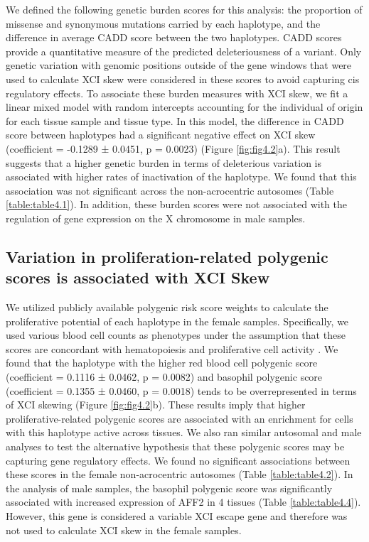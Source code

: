 We defined the following genetic burden scores for this analysis: the proportion of missense and synonymous mutations carried by each haplotype, and the difference in average CADD score \cite{Rentzsch2019-pk} between the two haplotypes. CADD scores provide a quantitative measure of the predicted deleteriousness of a variant. Only genetic variation with genomic positions outside of the gene windows that were used to calculate XCI skew were considered in these scores to avoid capturing cis regulatory effects. To associate these burden measures with XCI skew, we fit a linear mixed model with random intercepts accounting for the individual of origin for each tissue sample and tissue type. In this model, the difference in CADD score between haplotypes had a significant negative effect on XCI skew (coefficient = -0.1289 ± 0.0451, p = 0.0023) (Figure \ref{fig:fig4.2}a). This result suggests that a higher genetic burden in terms of deleterious variation is associated with higher rates of inactivation of the haplotype. We found that this association was not significant across the non-acrocentric autosomes (Table \ref{table:table4.1}). In addition, these burden scores were not associated with the regulation of gene expression on the X chromosome in male samples. 




\subsection{Variation in proliferation-related polygenic scores is associated with XCI Skew}

We utilized publicly available polygenic risk score weights to calculate the proliferative potential of each haplotype in the female samples. Specifically, we used various blood cell counts as phenotypes under the assumption that these scores are concordant with hematopoiesis and proliferative cell activity \cite{Loh2020-mb}. We found that the haplotype with the higher red blood cell polygenic score (coefficient = 0.1116 ± 0.0462, p = 0.0082) and basophil polygenic score (coefficient = 0.1355 ± 0.0460, p = 0.0018) tends to be overrepresented in terms of XCI skewing (Figure \ref{fig:fig4.2}b). These results imply that higher proliferative-related polygenic scores are associated with an enrichment for cells with this haplotype active across tissues. We also ran similar autosomal and male analyses to test the alternative hypothesis that these polygenic scores may be capturing gene regulatory effects. We found no significant associations between these scores in the female non-acrocentric autosomes (Table \ref{table:table4.2}). In the analysis of male samples, the basophil polygenic score was significantly associated with increased expression of AFF2 in 4 tissues (Table \ref{table:table4.4}). However, this gene is considered a variable XCI escape gene and therefore was not used to calculate XCI skew in the female samples.

